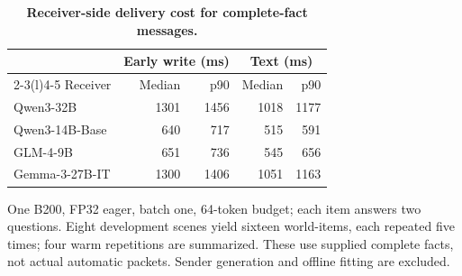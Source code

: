 \begin{table}[!htbp]
\caption{\textbf{Receiver-side delivery cost for complete-fact messages.}}
\label{tab:recovery_cost}
\centering\small
\setlength{\tabcolsep}{3pt}\renewcommand{\arraystretch}{1.08}
\begin{tabular*}{\linewidth}{@{\extracolsep{\fill}}lrrrr@{}}
\toprule
 & \multicolumn{2}{c}{Early write (ms)} & \multicolumn{2}{c}{Text (ms)} \\\cmidrule(lr){2-3}\cmidrule(l){4-5} Receiver & Median & p90 & Median & p90 \\
\midrule
Qwen3-32B & 1301 & 1456 & 1018 & 1177 \\
Qwen3-14B-Base & 640 & 717 & 515 & 591 \\
GLM-4-9B & 651 & 736 & 545 & 656 \\
Gemma-3-27B-IT & 1300 & 1406 & 1051 & 1163 \\
\bottomrule
\end{tabular*}
\par\vspace{3pt}
{\footnotesize\raggedright One B200, FP32 eager, batch one, 64-token budget; each item answers two questions. Eight development scenes yield sixteen world-items, each repeated five times; four warm repetitions are summarized. These use supplied complete facts, not actual automatic packets. Sender generation and offline fitting are excluded.\par}
\end{table}
